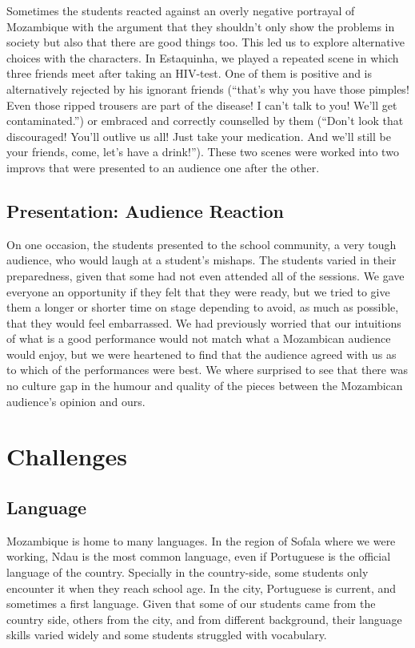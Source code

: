 \documentclass[article,twocolumn,twoside]{memoir}
\begin{document}
Sometimes the students reacted against an overly negative portrayal of
Mozambique with the argument that they shouldn't only show the problems in
society but also that there are good things too. This led us to explore
alternative choices with the characters. In Estaquinha, we played a repeated
scene in which three friends meet after taking an HIV-test. One of them is
positive and is alternatively rejected by his ignorant friends (``that's why
you have those pimples! Even those ripped trousers are part of the disease! I
can't talk to you! We'll get contaminated.'') or embraced and correctly
counselled by them (``Don't look that discouraged! You'll outlive us all! Just
take your medication. And we'll still be your friends, come, let's have a
drink!''). These two scenes were worked into two improvs that were presented to
an audience one after the other.

\section{Presentation: Audience Reaction}

On one occasion, the students presented to the school community, a very tough
audience, who would laugh at a student's mishaps. The students varied in their
preparedness, given that some had not even attended all of the sessions. We
gave everyone an opportunity if they felt that they were ready, but we tried to
give them a longer or shorter time on stage depending to avoid, as much as
possible, that they would feel embarrassed. We had previously worried that our
intuitions of what is a good performance would not match what a Mozambican
audience would enjoy, but we were heartened to find that the audience agreed
with us as to which of the performances were best. We where surprised to see
that there was no culture gap in the humour and quality of the pieces between
the Mozambican audience's opinion and ours.

\chapter{Challenges}
\section{Language}

Mozambique is home to many languages. In the region of Sofala where we were
working, Ndau is the most common language, even if Portuguese is the official
language of the country. Specially in the country-side, some students only
encounter it when they reach school age. In the city, Portuguese is current,
and sometimes a first language. Given that some of our students came from the
country side, others from the city, and from different background, their
language skills varied widely and some students struggled with vocabulary.
\end{document}
